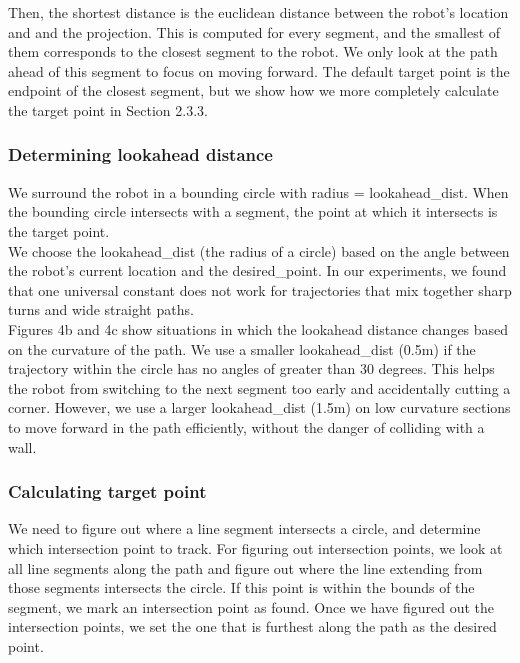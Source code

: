 \documentclass{article}
\begin{document}
Then, the shortest distance is the euclidean distance between the robot's location and and the projection. This is computed for every segment, and the smallest of them corresponds to the closest segment to the robot. We only look at the path ahead of this segment to focus on moving forward. The default target point is the endpoint of the closest segment, but we show how we more completely calculate the target point in Section 2.3.3.

\subsubsection{Determining lookahead distance}

We surround the robot in a bounding circle with radius = lookahead\_dist. When the bounding circle intersects with a segment, the point at which it intersects is the target point.\\



We choose the lookahead\_dist (the radius of a circle) based on the angle between the robot's current location and the desired\_point. In our experiments, we found that one universal constant does not work for trajectories that mix together sharp turns and wide straight paths. \\

Figures 4b and 4c show situations in which the lookahead distance changes based on the curvature of the path. We use a smaller lookahead\_dist (0.5m) if the trajectory within the circle has no angles of greater than 30 degrees. This helps the robot from switching to the next segment too early and accidentally cutting a corner. However, we use a larger lookahead\_dist (1.5m) on low curvature sections to move forward in the path efficiently, without the danger of colliding with a wall.\\

\subsubsection{Calculating target point}

We need to figure out where a line segment intersects a circle, and determine which intersection point to track. For figuring out intersection points, we look at all line segments along the path and figure out where the line extending from those segments intersects the circle. If this point is within the bounds of the segment, we mark an intersection point as found. Once we have figured out the intersection points, we set the one that is furthest along the path as the desired point.\\
\end{document}
